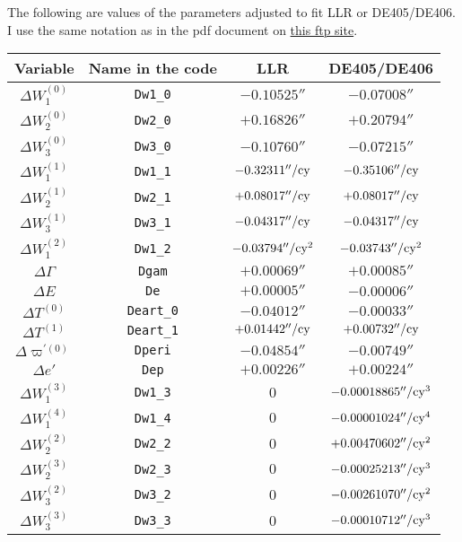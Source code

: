 \documentclass[12pt]{article}
\begin{document}
The following are values of the parameters adjusted to fit LLR or DE405/DE406. 
I use the same notation as in the pdf document on 
\href{ftp://cyrano-se.obspm.fr/pub/2_lunar_solutions/2_elpmpp02/}{this ftp site}. 
\vskip 0.5cm
\begin{tabular}{cccc} 
\hline
 {\bf Variable} & {\bf Name in the code} & {\bf LLR} & 
{\bf DE405/DE406} \\
\hline
  $\Delta W_1^{(0)}$ & {\tt Dw1\_0} & $-0.10525''$ & $-0.07008''$ \\
  $\Delta W_2^{(0)}$ & {\tt Dw2\_0} & $+0.16826''$ & $+0.20794''$ \\
  $\Delta W_3^{(0)}$ & {\tt Dw3\_0} & $-0.10760''$ & $-0.07215''$ \\
  $\Delta W_1^{(1)}$ & {\tt Dw1\_1} & $-0.32311''/{\rm cy}$ & $-0.35106''/{\rm cy}$ \\
  $\Delta W_2^{(1)}$ & {\tt Dw2\_1} & $+0.08017''/{\rm cy}$ & $+0.08017''/{\rm cy}$ \\
  $\Delta W_3^{(1)}$ & {\tt Dw3\_1} & $-0.04317''/{\rm cy}$ & $-0.04317''/{\rm cy}$ \\
  $\Delta W_1^{(2)}$ & {\tt Dw1\_2} & $-0.03794''/{\rm cy}^2$ & $-0.03743''/{\rm cy}^2$ \\
  $\Delta \Gamma$ & {\tt Dgam} & $+0.00069''$ & $+0.00085''$ \\ 
  $\Delta E$ & {\tt De} & $+0.00005''$ & $-0.00006''$ \\
  $\Delta T^{(0)}$ & {\tt Deart\_0} & $-0.04012''$ & $-0.00033''$ \\
  $\Delta T^{(1)}$ & {\tt Deart\_1} & $+0.01442''/{\rm cy}$ & $+0.00732''/{\rm cy}$ \\
  $\Delta \varpi^{'(0)}$ & {\tt Dperi} & $-0.04854''$ & $-0.00749''$ \\
  $\Delta e'$ & {\tt Dep} & $+0.00226''$ & $+0.00224''$ \\
  $\Delta W_1^{(3)}$ & {\tt Dw1\_3} & $0$ & $-0.00018865''/{\rm cy}^3$ \\
  $\Delta W_1^{(4)}$ & {\tt Dw1\_4} & $0$ & $-0.00001024''/{\rm cy}^4$ \\
  $\Delta W_2^{(2)}$ & {\tt Dw2\_2} & $0$ & $+0.00470602''/{\rm cy}^2$ \\
  $\Delta W_2^{(3)}$ & {\tt Dw2\_3} & $0$ & $-0.00025213''/{\rm cy}^3$ \\
  $\Delta W_3^{(2)}$ & {\tt Dw3\_2} & $0$ & $-0.00261070''/{\rm cy}^2$ \\
  $\Delta W_3^{(3)}$ & {\tt Dw3\_3} & $0$ & $-0.00010712''/{\rm cy}^3$ \\
\hline
\end{tabular}
\end{document}
